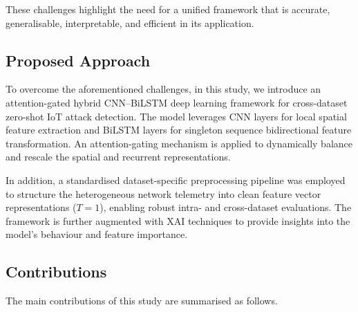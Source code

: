 \documentclass[a4paper,fleqn]{cas-sc}
\begin{document}
These challenges highlight the need for a unified framework that is accurate, generalisable, interpretable, and efficient in its application.

\subsection{Proposed Approach}

To overcome the aforementioned challenges, in this study, we introduce an attention-gated hybrid CNN--BiLSTM deep learning framework for cross-dataset zero-shot IoT attack detection. The model leverages CNN layers for local spatial feature extraction and BiLSTM layers for singleton sequence bidirectional feature transformation. An attention-gating mechanism is applied to dynamically balance and rescale the spatial and recurrent representations.

In addition, a standardised dataset-specific preprocessing pipeline was employed to structure the heterogeneous network telemetry into clean feature vector representations ($T=1$), enabling robust intra- and cross-dataset evaluations. The framework is further augmented with XAI techniques to provide insights into the model’s behaviour and feature importance.

\subsection{Contributions}

The main contributions of this study are summarised as follows.
\end{document}
